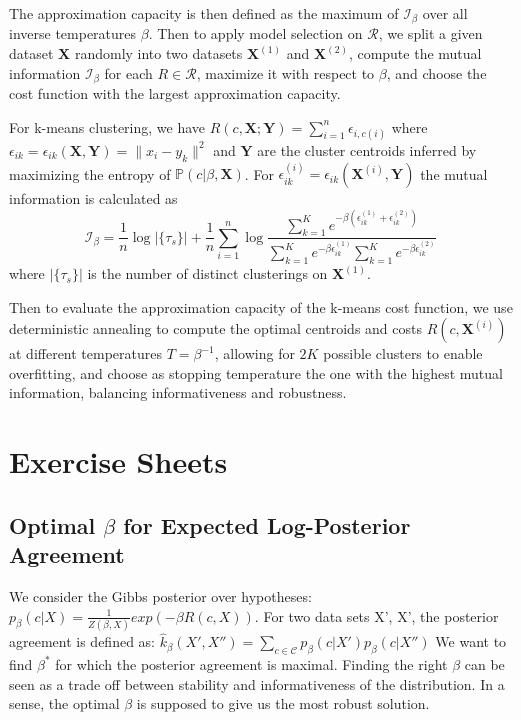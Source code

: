 \documentclass[9pt,parskip]{scrartcl}
\begin{document}
\begin{multicols*}{4}
The approximation capacity is then defined as the maximum of $\mathcal{I}_\beta$ over all inverse temperatures $\beta$. Then to apply model selection on $\mathcal{R}$, we split a given dataset $\mathbf{X}$ randomly into two datasets $\mathbf{X}^{(1)}$ and $\mathbf{X}^{(2)}$, compute the mutual information $\mathcal{I}_\beta$ for each $R \in \mathcal{R}$, maximize it with respect to $\beta$, and choose the cost function with the largest approximation capacity.

For k-means clustering, we have $R(c, \mathbf{X}; \mathbf{Y}) = \sum_{i=1}^n \epsilon_{i,c(i)}$ where $\epsilon_{ik} = \epsilon_{ik}(\mathbf{X}, \mathbf{Y}) = \|x_i - y_k\|^2$ and $\mathbf{Y}$ are the cluster centroids inferred by maximizing the entropy of $\mathbb{P}(c|\beta, \mathbf{X})$. For $\epsilon^{(i)}_{ik} = \epsilon_{ik}(\mathbf{X}^{(i)}, \mathbf{Y})$ the mutual information is calculated as
$$\mathcal{I}_\beta = \frac{1}{n} \log |\{\tau_s\}| + \frac{1}{n} \sum_{i=1}^n \log \frac{\sum_{k=1}^K e^{-\beta(\epsilon^{(1)}_{ik}+\epsilon^{(2)}_{ik})}}{\sum_{k=1}^K e^{-\beta\epsilon^{(1)}_{ik}} \sum_{k=1}^K e^{-\beta\epsilon^{(2)}_{ik}}}$$
where $|\{\tau_s\}|$ is the number of distinct clusterings on $\mathbf{X}^{(1)}$. 

Then to evaluate the approximation capacity of the k-means cost function, we use deterministic annealing to compute the optimal centroids and costs $R(c, \mathbf{X}^{(i)})$ at different temperatures $T = \beta^{-1}$, allowing for $2K$ possible clusters to enable overfitting, and choose as stopping temperature the one with the highest mutual information, balancing informativeness and robustness.

\section*{Exercise Sheets}
\subsection*{Optimal $\beta$ for Expected Log-Posterior Agreement}

We consider the Gibbs posterior over hypotheses:
$p_{\beta}(c|X) = \frac{1}{Z(\beta, X)}exp(-\beta R(c,X))$.
For two data sets X', X', the posterior agreement is defined as: 
$\hat k_{\beta}(X',X'') = \sum_{c \in \mathcal{C}}p_{\beta}(c|X')p_{\beta}(c|X'')$
We want to find $\beta^*$ for which the posterior agreement is maximal. Finding the right $\beta$ can be seen as a trade off between stability and informativeness of the distribution. 
In a sense, the optimal $\beta$ is supposed to give us the most robust solution.
\end{multicols*}
\end{document}
